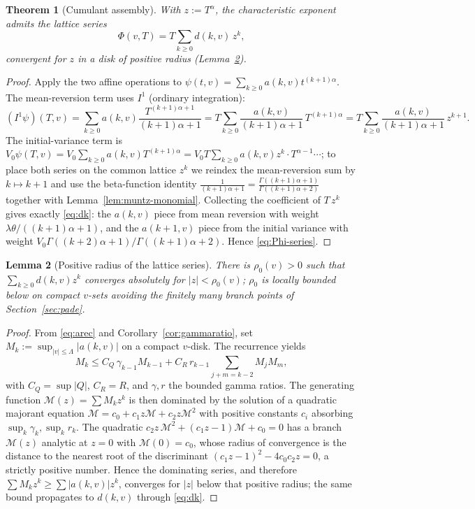 \documentclass[11pt]{article}
\theoremstyle{plain}
\newtheorem{theorem}{Theorem}[section]
\newtheorem{lemma}[theorem]{Lemma}
\theoremstyle{definition}
\theoremstyle{remark}
\begin{document}
\begin{theorem}[Cumulant assembly]\label{thm:cumulant}
With $z:=T^\alpha$, the characteristic exponent admits the lattice series
\begin{equation}\label{eq:Phi-series}
   \Phi(v,T)=T\sum_{k\ge0} d(k,v)\,z^{k},
\end{equation}
convergent for $z$ in a disk of positive radius (Lemma~\ref{lem:radius}).
\end{theorem}
\begin{proof}
Apply the two affine operations to $\psi(t,v)=\sum_{k\ge0}a(k,v)t^{(k+1)\alpha}$.
The mean-reversion term uses $I^1$ (ordinary integration):
\[
   (I^1\psi)(T,v)=\sum_{k\ge0}a(k,v)\frac{T^{(k+1)\alpha+1}}{(k+1)\alpha+1}
   =T\sum_{k\ge0}\frac{a(k,v)}{(k+1)\alpha+1}\,T^{(k+1)\alpha}
   =T\sum_{k\ge0}\frac{a(k,v)}{(k+1)\alpha+1}\,z^{k+1}.
\]
The initial-variance term is $V_0\psi(T,v)=V_0\sum_{k\ge0}a(k,v)T^{(k+1)\alpha}
=V_0 T\sum_{k\ge0}a(k,v)z^{k}\cdot T^{\alpha-1}\cdots$; to place both series on the
common lattice $z^k$ we reindex the mean-reversion sum by $k\mapsto k+1$ and use
the beta-function identity $\frac{1}{(k+1)\alpha+1}=\frac{\Gamma((k+1)\alpha+1)}
{\Gamma((k+1)\alpha+2)}$ together with Lemma~\ref{lem:muntz-monomial}. Collecting
the coefficient of $T\,z^{k}$ gives exactly \eqref{eq:dk}: the $a(k,v)$ piece from
mean reversion with weight $\lambda\theta/((k+1)\alpha+1)$, and the $a(k+1,v)$
piece from the initial variance with weight $V_0\Gamma((k+2)\alpha+1)/
\Gamma((k+1)\alpha+2)$. Hence \eqref{eq:Phi-series}.
\end{proof}

\begin{lemma}[Positive radius of the lattice series]\label{lem:radius}
There is $\rho_0(v)>0$ such that $\sum_{k\ge0}d(k,v)z^k$ converges absolutely for
$|z|<\rho_0(v)$; $\rho_0$ is locally bounded below on compact $v$-sets avoiding the
finitely many branch points of Section~\ref{sec:pade}.
\end{lemma}
\begin{proof}
From \eqref{eq:arec} and Corollary~\ref{cor:gammaratio}, set
$M_k:=\sup_{|v|\le\Lambda}|a(k,v)|$ on a compact $v$-disk. The recurrence yields
\[
   M_k\le C_Q\,\gamma_{k-1}M_{k-1}+C_R\,r_{k-1}\!\!\sum_{j+m=k-2}\!\!M_jM_m,
\]
with $C_Q=\sup|Q|$, $C_R=R$, and $\gamma,r$ the bounded gamma ratios. The
generating function $\mathcal M(z)=\sum M_k z^k$ is then dominated by the solution
of a quadratic majorant equation $\mathcal M= c_0+c_1 z\mathcal M+c_2 z\mathcal M^2$
with positive constants $c_i$ absorbing $\sup_k\gamma_k,\sup_k r_k$. The quadratic
$c_2 z\,\mathcal M^2+(c_1z-1)\mathcal M+c_0=0$ has a branch $\mathcal M(z)$
analytic at $z=0$ with $\mathcal M(0)=c_0$, whose radius of convergence is the
distance to the nearest root of the discriminant
$(c_1z-1)^2-4c_0c_2z=0$, a strictly positive number. Hence the dominating series,
and therefore $\sum M_kz^k\ge\sum|a(k,v)|z^k$, converges for $|z|$ below that
positive radius; the same bound propagates to $d(k,v)$ through \eqref{eq:dk}.
\end{proof}
\end{document}
